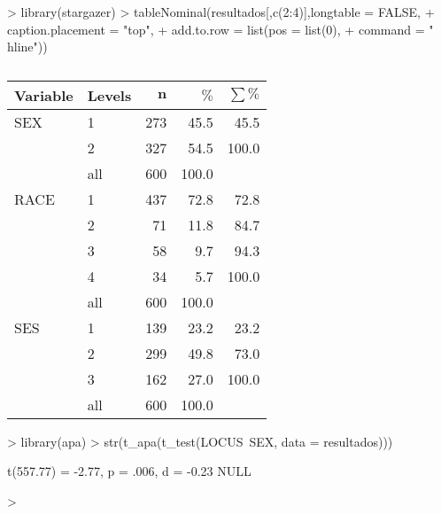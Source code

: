 \documentclass{article}
\begin{document}
\begin{Schunk}
\begin{Sinput}
> library(stargazer)
> tableNominal(resultados[,c(2:4)],longtable = FALSE,
+              caption.placement = "top",
+              add.to.row = list(pos = list(0),
+                                command = "\\hline"))
\end{Sinput}
% latex table generated in R 3.6.0 by xtable 1.8-4 package
% Wed Sep 18 13:44:43 2019
\begin{table}[ht]
\centering
\caption{} 
\label{}
\begingroup\footnotesize
\begin{tabular}{ll|rrr}
 \textbf{Variable} & \textbf{Levels} & $\mathbf{n}$ & $\mathbf{\%}$ & $\mathbf{\sum \%}$ \\ 
  \hline \hline
SEX & 1 & 273 & 45.5 & 45.5 \\ 
   & 2 & 327 & 54.5 & 100.0 \\ 
   \hline
 & all & 600 & 100.0 &  \\ 
   \hline
\hline
RACE & 1 & 437 & 72.8 & 72.8 \\ 
   & 2 & 71 & 11.8 & 84.7 \\ 
   & 3 & 58 & 9.7 & 94.3 \\ 
   & 4 & 34 & 5.7 & 100.0 \\ 
   \hline
 & all & 600 & 100.0 &  \\ 
   \hline
\hline
SES & 1 & 139 & 23.2 & 23.2 \\ 
   & 2 & 299 & 49.8 & 73.0 \\ 
   & 3 & 162 & 27.0 & 100.0 \\ 
   \hline
 & all & 600 & 100.0 &  \\ 
   \hline
\hline
\end{tabular}
\endgroup
\end{table}\end{Schunk}


\begin{Schunk}
\begin{Sinput}
> library(apa)
> str(t_apa(t_test(LOCUS~SEX, data = resultados)))
\end{Sinput}
\begin{Soutput}
t(557.77) = -2.77, p = .006, d = -0.23 NULL
\end{Soutput}
\begin{Sinput}
> 
\end{Sinput}
\end{Schunk}
\end{document}
